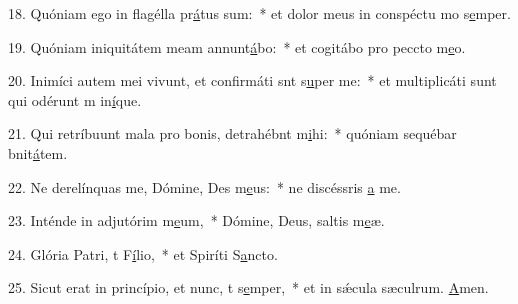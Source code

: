 18. Quóniam ego in flagélla pr\uline{á}tus sum:~* et dolor meus in conspéctu mo s\uline{e}mper.\par 
19. Quóniam iniquitátem meam annunt\uline{á}bo:~* et cogitábo pro peccto m\uline{e}o.\par 
20. Inimíci autem mei vivunt, et confirmáti snt s\uline{u}per me:~* et multiplicáti sunt qui odérunt m in\uline{í}que.\par 
21. Qui retríbuunt mala pro bonis, detrahébnt m\uline{i}hi:~* quóniam sequébar bnit\uline{á}tem.\par 
22. Ne derelínquas me, Dómine, Des m\uline{e}us:~* ne discéssris \uline{a} me.\par 
23. Inténde in adjutórim m\uline{e}um,~* Dómine, Deus, saltis m\uline{e}æ.\par 
24. Glória Patri, t F\uline{í}lio,~* et Spiríti S\uline{a}ncto.\par 
25. Sicut erat in princípio, et nunc, t s\uline{e}mper,~* et in sǽcula sæculrum. \uline{A}men.\par 
